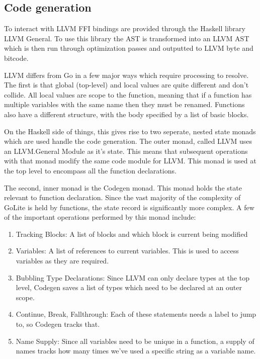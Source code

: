 \documentclass[11pt]{article}
\begin{document}
\subsection{Code generation}
To interact with LLVM FFI bindings are provided through the Haskell library LLVM General. To use this library the AST is transformed into an LLVM AST which is then run through optimization passes and outputted to LLVM byte and bitcode. 

LLVM differs from Go in a few major ways which require processing to resolve. The first is that global (top-level) and local values are quite different and don't collide. All local values are scope to the function, meaning that if a function has multiple variables with the same name then they must be renamed. Functions also have a different structure, with the body specified by a list of basic blocks. 

On the Haskell side of things, this gives rise to two seperate, nested state monads which are used handle the code generation. The outer monad, called LLVM uses an LLVM.General Module as it's state. This means that subsequent operations with that monad modify the same code module for LLVM. This monad is used at the top level to encompass all the function declarations. 

The second, inner monad is the Codegen monad. This monad holds the state relevant to function declaration. Since the vast majority of the complexity of GoLite is held by functions, the state record is significantly more complex. A few of the important operations performed by this monad include:

\begin{enumerate}
\item Tracking Blocks: A list of blocks and which block is current being modified
\item Variables: A list of references to current variables. This is used to access variables as they are required.
\item Bubbling Type Declarations: Since LLVM can only declare types at the top level, Codegen saves a list of types which need to be declared at an outer scope. 
\item Continue, Break, Fallthrough: Each of these statements needs a label to jump to, so Codegen tracks that. 
\item Name Supply: Since all variables need to be unique in a function, a supply of names tracks how many times we've used a specific string as a variable name.
\end{enumerate}
\end{document}
